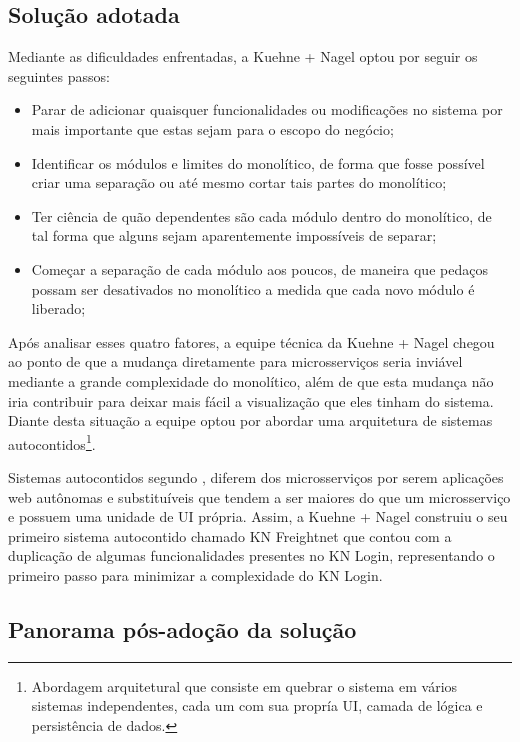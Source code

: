 \subsection{Solução adotada}

Mediante as dificuldades enfrentadas, a Kuehne + Nagel optou por seguir os seguintes passos:

\begin{itemize}
    \item Parar de adicionar quaisquer funcionalidades ou modificações no sistema por mais
        importante que estas sejam para o escopo do negócio;
    \item Identificar os módulos e limites do monolítico, de forma que fosse possível criar uma
        separação ou até mesmo cortar tais partes do monolítico;
    \item Ter ciência de quão dependentes são cada módulo dentro do monolítico, de tal forma que
        alguns sejam aparentemente impossíveis de separar;
    \item Começar a separação de cada módulo aos poucos, de maneira que pedaços possam ser
        desativados no monolítico a medida que cada novo módulo é liberado;
\end{itemize}

Após analisar esses quatro fatores, a equipe técnica da Kuehne + Nagel chegou ao ponto de que a
mudança diretamente para microsserviços seria inviável mediante a grande complexidade do monolítico,
além de que esta mudança não iria contribuir para deixar mais fácil a visualização que eles
tinham do sistema. Diante desta situação a equipe optou por abordar uma arquitetura de sistemas
autocontidos\footnote{Abordagem arquitetural que consiste em quebrar o sistema em vários sistemas
independentes, cada um com sua propría \gls{UI}, camada de lógica e persistência de dados.}.

Sistemas autocontidos segundo , diferem dos
microsserviços por serem aplicações web autônomas e substituíveis que tendem a ser maiores do
que um microsserviço e possuem uma unidade de \gls{UI} própria. Assim, a Kuehne + Nagel construiu o
seu primeiro sistema autocontido chamado KN Freightnet que contou com a duplicação de algumas
funcionalidades presentes no KN Login, representando o primeiro passo para minimizar a complexidade
do KN Login.

\subsection{Panorama pós-adoção da solução}

